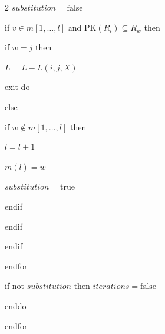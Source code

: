\begin{multicols}{2}
\hspace*{4mm}$substitution=\mathrm{false}$



\hspace*{4mm}if $v\in m[1,\ldots ,l]$ and $\mathrm{PK}(R_i)\subseteq R_w$ then



\hspace*{5mm}if $w=j$ then



\hspace*{6mm}$L=L-L(i,j,X)$



\hspace*{6mm}exit do



\hspace*{5mm}else



\hspace*{6mm}if $w\not\in m[1,\ldots ,l]$ then



\hspace*{7mm}$ l=l+1$



\hspace*{7mm}$m(l)=w$



\hspace*{7mm}$substitution=\mathrm{true}$



\hspace*{6mm}endif



\hspace*{5mm}endif



\hspace*{4mm}endif



\hspace*{3mm}endfor



\hspace*{4mm}if not $substitution$ then $iterations=\mathrm{false}$



\hspace*{2mm}enddo



\noindent

endfor




\end{multicols}
